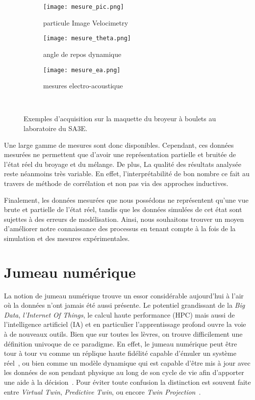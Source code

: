\begin{figure}[b]
    \centering
    \begin{subfigure}[b]{0.3\textwidth}
        \texttt{[image: mesure\_pic.png]}
        \caption{particule Image Velocimetry}
    \end{subfigure}
    \hfill
    \begin{subfigure}[b]{0.3\textwidth}
        \texttt{[image: mesure\_theta.png]}
        \caption{angle de repos dynamique}
    \end{subfigure}
    \hfill
    \begin{subfigure}[b]{0.3\textwidth}
        \texttt{[image: mesure\_ea.png]}
        \caption{mesures electro-acoustique}
    \end{subfigure}
    \caption{Exemples d'acquisition sur la maquette du broyeur à boulets au laboratoire du SA3E.}~\label{fig:mesures}
\end{figure}

Une large gamme de mesures sont donc disponibles. Cependant, ces données mesurées ne permettent que d'avoir une représentation partielle et bruitée de l'état réel du broyage et du mélange. De plus, La qualité des résultats analysée reste néanmoins très variable. En effet, l'interprétabilité de bon nombre ce fait au travers de méthode de corrélation et non pas via des approches inductives.

Finalement, les données mesurées que nous possédons ne représentent qu'une vue brute et partielle de l'état réel, tandis que les données simulées de cet état sont sujettes à des erreurs de modélisation. Ainsi, nous souhaitons trouver un moyen d'améliorer notre connaissance des processus en tenant compte à la fois de la simulation et des mesures expérimentales.

\section{Jumeau numérique}

La notion de jumeau numérique trouve un essor considérable aujourd'hui à l'air où la données n'ont jamais été aussi présente. Le potentiel grandissant de la \textit{Big Data}, \textit{l'Internet Of Things}, le calcul haute performance (HPC) mais aussi de l'intelligence artificiel (IA) et en particulier l'apprentissage profond ouvre la voie à de nouveaux outils. Bien que sur toutes les lèvres, on trouve difficilement une définition univoque de ce paradigme.
En effet, le jumeau numérique peut être tour à tour vu comme un réplique haute fidélité capable d'émuler un système réel~\cite{noauthor_digital_nodate}, ou bien comme un modèle dynamique qui est capable d'être mis à jour avec les données de son pendant physique au long de son cycle de vie afin d'apporter une aide à la décision~\cite{AIAA2020}. Pour éviter toute confusion la distinction est souvent faite entre \textit{Virtual Twin}, \textit{Predictive Twin}, ou encore \textit{Twin Projection}~\cite{Kvamsdal}.

